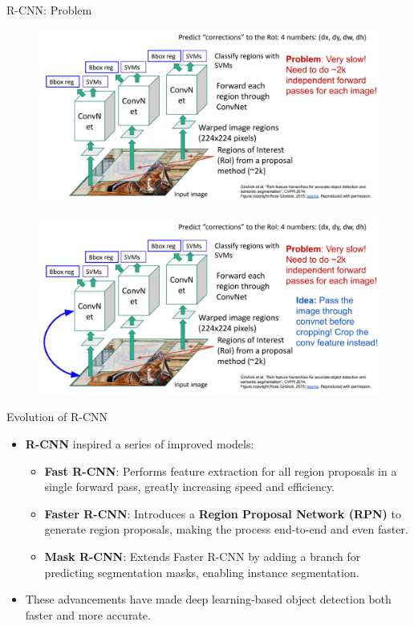 \begin{frame}[allowframebreaks]{R-CNN: Problem}
    \begin{figure}
        \centering
        \includegraphics[width=1.0\textwidth,height=1.0\textheight,keepaspectratio]{images/object-detect/rcnn_2.png}
    \end{figure}

\framebreak

    \begin{figure}
        \centering
        \includegraphics[width=1.0\textwidth,height=1.0\textheight,keepaspectratio]{images/object-detect/rcnn_3.png}
    \end{figure}
\end{frame}

\begin{frame}{Evolution of R-CNN}
    \begin{itemize}
        \item \textbf{R-CNN} inspired a series of improved models:
        \begin{itemize}
            \item \textbf{Fast R-CNN}: Performs feature extraction for all region proposals in a single forward pass, greatly increasing speed and efficiency.
            \item \textbf{Faster R-CNN}: Introduces a \textbf{Region Proposal Network (RPN)} to generate region proposals, making the process end-to-end and even faster.
            \item \textbf{Mask R-CNN}: Extends Faster R-CNN by adding a branch for predicting segmentation masks, enabling instance segmentation.
        \end{itemize}
        \item These advancements have made deep learning-based object detection both faster and more accurate.
    \end{itemize}
\end{frame}